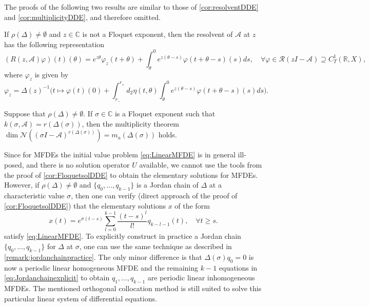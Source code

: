 \documentclass[english]{myarticle}
\begin{document}
\begin{sloppypar}
The proofs of the following two results are similar to those of \cref{cor:resolventDDE} and \cref{cor:multiplicityDDE}, and therefore omitted.
\begin{corollary}
If $\rho(\Delta) \neq \emptyset$ and $z \in \mathbb{C}$ is not a Floquet exponent, then the resolvent of $\mathcal{A}$ at $z$ has the following representation
\begin{equation*}
    (R(z,\mathcal{A}) \varphi)(t)(\theta) = e^{z \theta} \varphi_z(t+\theta) + \int_\theta^0 e^{z(\theta-s)} \varphi(t+\theta-s)(s) ds, \quad \forall \varphi \in \mathcal{R}(zI-\mathcal{A}) \supseteq C_T^1(\mathbb{R},X),
\end{equation*}
where $\varphi_z$ is given by
\begin{equation*}
    \varphi_z = \Delta(z)^{-1} \bigg( t \mapsto \varphi(t)(0) + \int_{r_{-}}^{r_{+}} d_2 \eta(t,\theta)\int_{\theta}^{0} e^{z(\theta - s)} \varphi(t + \theta - s)(s) ds \bigg).
\end{equation*}
\end{corollary}

\begin{corollary}
Suppose that $\rho(\Delta) \neq \emptyset$. If $\sigma \in \mathbb{C}$ is a Floquet exponent such that $k(\sigma,\mathcal{A}) = r(\Delta(\sigma))$, then the multiplicity theorem $\dim \mathcal{N}((\sigma I - \mathcal{A})^{r(\Delta(\sigma))}) =  m_a(\Delta(\sigma))$ holds.
\end{corollary}

Since for MFDEs the initial value problem \eqref{eq:LinearMFDE} is in general ill-posed, and there is no solution operator $U$ available, we cannot use the tools from the proof of \cref{cor:FloquetsolDDE} to obtain the elementary solutions for MFDEs. However, if $\rho(\Delta) \neq \emptyset$ and $\{{q}_{0},\dots,{q}_{k-1} \}$ is a Jordan chain of $\Delta$ at a characteristic value $\sigma$, then one can verify (direct approach of the proof of \cref{cor:FloquetsolDDE}) that the elementary solutions $x$ of the form
\begin{equation*}
    x(t) = e^{\sigma(t-s)} \sum_{l=0}^{k-1} \frac{(t-s)^l}{l!}q_{k-l-1}(t), \quad \forall t \geq s.
\end{equation*}
satisfy \eqref{eq:LinearMFDE}. To explicitly construct in practice a Jordan chain $\{q_0,\dots,q_{k-1}\}$ for $\Delta$ at $\sigma$, one can use the same technique as described in \cref{remark:jordanchainpractice}. The only minor difference is that $\Delta(\sigma)q_0 = 0$ is now a periodic linear homogeneous MFDE and the remaining $k-1$ equations in \eqref{eq:Jordanchainexplicit} to obtain $q_1,\dots,q_{k-1}$ are periodic linear inhomogeneous MFDEs. The mentioned orthogonal collocation method is still suited to solve this particular linear system of differential equations.


\end{sloppypar}
\end{document}
